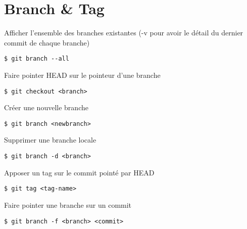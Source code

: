 \section*{Branch \& Tag}

Afficher l'ensemble des branches existantes (-v pour avoir le détail du dernier commit de chaque branche)
\begin{lstlisting}
$ git branch --all 
\end{lstlisting}
Faire pointer HEAD sur le pointeur d'une branche
\begin{lstlisting}
$ git checkout <branch>
\end{lstlisting}
Créer une nouvelle branche
\begin{lstlisting}
$ git branch <newbranch>
\end{lstlisting}
Supprimer une branche locale
\begin{lstlisting}
$ git branch -d <branch>
\end{lstlisting}
Apposer un tag sur le commit pointé par HEAD
\begin{lstlisting}
$ git tag <tag-name>
\end{lstlisting}
Faire pointer une branche sur un commit
\begin{lstlisting}
$ git branch -f <branch> <commit>
\end{lstlisting}